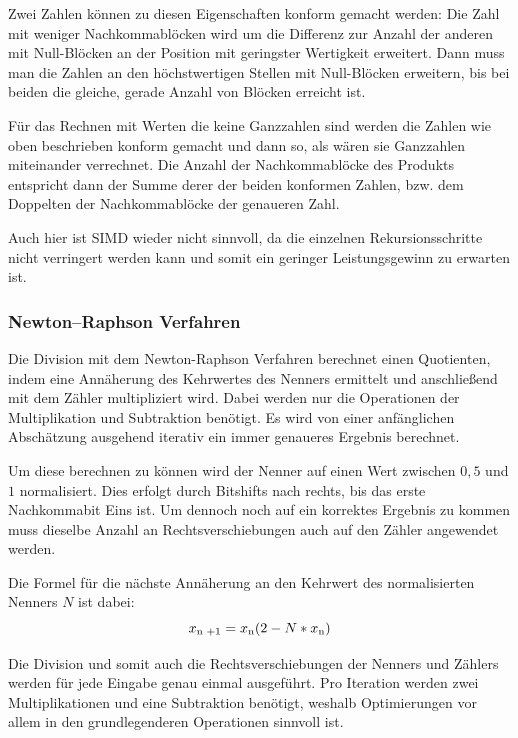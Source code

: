 \documentclass[course=erap]{aspdoc}
\begin{document}
	Zwei Zahlen können zu diesen Eigenschaften konform gemacht werden: Die Zahl mit weniger Nachkommablöcken wird um die Differenz zur Anzahl der anderen mit Null-Blöcken an der Position mit geringster Wertigkeit erweitert. Dann muss man die Zahlen an den höchstwertigen Stellen mit Null-Blöcken erweitern, bis bei beiden die gleiche, gerade Anzahl von Blöcken erreicht ist.\newline
	
	Für das Rechnen mit Werten die keine Ganzzahlen sind werden die Zahlen wie oben beschrieben konform gemacht und dann so, als wären sie Ganzzahlen miteinander verrechnet. Die Anzahl der Nachkommablöcke des Produkts entspricht dann der Summe derer der beiden konformen Zahlen, bzw. dem Doppelten der Nachkommablöcke der genaueren Zahl.\newline 
	
	Auch hier ist SIMD wieder nicht sinnvoll, da die einzelnen Rekursionsschritte nicht verringert werden kann und somit ein geringer Leistungsgewinn zu erwarten ist.
	
	\subsubsection{Newton–Raphson Verfahren}
	Die Division mit dem Newton-Raphson Verfahren berechnet einen Quotienten, indem eine Annäherung des Kehrwertes des Nenners ermittelt und anschließend mit dem Zähler multipliziert wird. Dabei werden nur die Operationen der Multiplikation und Subtraktion benötigt. Es wird von einer anfänglichen Abschätzung ausgehend iterativ ein immer genaueres Ergebnis berechnet. 
	
	Um diese berechnen zu können wird der Nenner auf einen Wert zwischen $0,5$ und $1$ \glqq normalisiert\grqq. Dies erfolgt durch Bitshifts nach rechts, bis das erste Nachkommabit Eins ist. Um dennoch noch auf ein korrektes Ergebnis zu kommen muss dieselbe Anzahl an Rechtsverschiebungen auch auf den Zähler angewendet werden.\newline 
	
	Die Formel für die nächste Annäherung an den Kehrwert des normalisierten Nenners $N$ ist dabei:
	\begin{equation*}
		x\textsubscript{n +1} = x\textsubscript{n}(2 - N*x\textsubscript{n})
	\end{equation*}
	
	Die Division und somit auch die Rechtsverschiebungen der Nenners und Zählers werden für jede Eingabe genau einmal ausgeführt. Pro Iteration werden zwei Multiplikationen und eine Subtraktion benötigt, weshalb Optimierungen vor allem in den grundlegenderen Operationen sinnvoll ist.\newline
	
\end{document}
